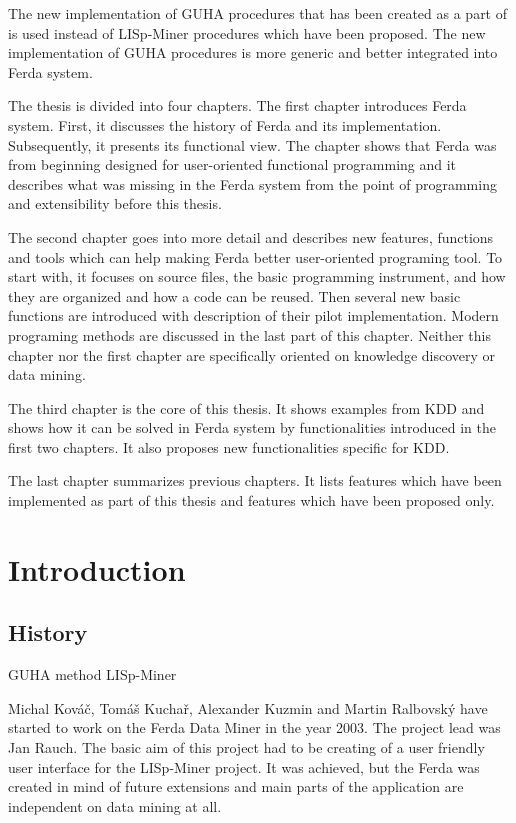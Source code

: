 \documentclass[a4paper,12pt]{book}
\begin{document}
The new implementation of GUHA procedures that has been created as a part of \cite[diploma thesis of Tomáš Kuchař]{thesisKuchar} is used instead of LISp-Miner procedures which have been proposed. The new implementation of GUHA procedures is more generic and better integrated into Ferda system.


The thesis is divided into four chapters. The first chapter introduces Ferda system. First, it discusses the history of Ferda and its implementation. Subsequently, it presents its functional view. The chapter shows that Ferda was from beginning designed for user-oriented functional programming and it describes what was missing in the Ferda system from the point of programming and extensibility before this thesis.

The second chapter goes into more detail and describes new features, functions and tools which can help making Ferda better user-oriented programing tool. To start with, it focuses on source files, the basic programming instrument, and how they are organized and how a code can be reused. Then several new basic functions are introduced with description of their pilot implementation. Modern programing methods are discussed in the last part of this chapter. Neither this chapter nor the first chapter are specifically oriented on knowledge discovery or data mining.

The third chapter is the core of this thesis. It shows examples from KDD and shows how it can be solved in Ferda system by functionalities introduced in the first two chapters. It also proposes new functionalities specific for KDD.

The last chapter summarizes previous chapters. It lists features which have been implemented as part of this thesis and features which have been proposed only.

\section{Introduction}
\subsection{History}
GUHA method
LISp-Miner

Michal Kováč, Tomáš Kuchař, Alexander Kuzmin and Martin Ralbovský have started to work on the Ferda Data Miner in the year 2003. The project lead was Jan Rauch. The basic aim of this project had to be creating of a user friendly user interface for the LISp-Miner project. It was achieved, but the Ferda was created in mind of future extensions and main parts of the application are independent on data mining at all.
\end{document}
